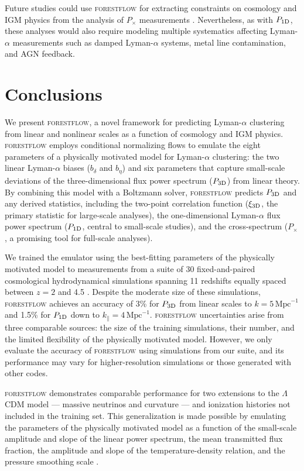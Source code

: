 \documentclass[longauth]{aa}
\newcommand{\lya}{Lyman-$\alpha$\xspace}
\newcommand{\pcross}{$P_{\times}$\xspace}
\newcommand{\poned}{\ensuremath{P_{\rm 1D}}\xspace}
\newcommand{\xithreed}{\ensuremath{\xi_{\rm 3D}}\xspace}
\newcommand{\pthreed}{\ensuremath{P_{\rm 3D}}\xspace}
\newcommand{\forestflow}{\textsc{forestflow}\xspace}
\newcommand{\iMpc}{\ensuremath{\,\mathrm{Mpc}^{-1}}}
\begin{document}
Future studies could use \forestflow for extracting constraints on cosmology and IGM physics from the analysis of \pcross measurements \citep[e.g.,][]{Karim2023}. Nevertheless, as with \poned, these analyses would also require modeling multiple systematics affecting \lya measurements such as damped \lya systems, metal line contamination, and AGN feedback.



\section{Conclusions}
\label{sec:conclusions}

We present \forestflow, a novel framework for predicting \lya clustering from linear and nonlinear scales as a function of cosmology and IGM physics. \forestflow employs conditional normalizing flows to emulate the eight parameters of a physically motivated model for \lya clustering: the two linear \lya biases ($b_\delta$ and $b_\eta$) and six parameters that capture small-scale deviations of the three-dimensional flux power spectrum (\pthreed) from linear theory. By combining this model with a Boltzmann solver, \forestflow predicts \pthreed and any derived statistics, including the two-point correlation function (\xithreed, the primary statistic for large-scale analyses), the one-dimensional \lya flux power spectrum (\poned, central to small-scale studies), and the cross-spectrum (\pcross, a promising tool for full-scale analyses).

We trained the emulator using the best-fitting parameters of the physically motivated model to measurements from a suite of 30 fixed-and-paired cosmological hydrodynamical simulations spanning 11 redshifts equally spaced between $z=2$ and 4.5 \citep{Pedersen2021}. Despite the moderate size of these simulations, \forestflow achieves an accuracy of 3\% for \pthreed from linear scales to $k=5\iMpc$ and 1.5\% for \poned down to $k_\parallel=4\iMpc$. \forestflow uncertainties arise from three comparable sources: the size of the training simulations, their number, and the limited flexibility of the physically motivated model. However, we only evaluate the accuracy of \forestflow using simulations from our suite, and its performance may vary for higher-resolution simulations or those generated with other codes.

\forestflow demonstrates comparable performance for two extensions to the $\Lambda$CDM model --- massive neutrinos and curvature --- and ionization histories not included in the training set. This generalization is made possible by emulating the parameters of the physically motivated model as a function of the small-scale amplitude and slope of the linear power spectrum, the mean transmitted flux fraction, the amplitude and slope of the temperature-density relation, and the pressure smoothing scale \citep[see][]{pedersen2023CompressingCosmologicalInformation, cabayol-garcia2023NeuralNetworkEmulator}.
\end{document}
